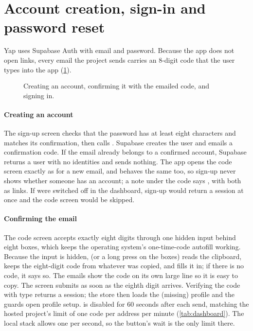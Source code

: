\section{Account creation, sign-in and password reset}
\label{sec:flow-account}

Yap uses Supabase Auth with email and password. Because the app does not open links, every email the
project sends carries an 8-digit code that the user types into the app (\cref{fig:seq-account}).

\begin{figure}[ht]
  \centering
  
  \caption{Creating an account, confirming it with the emailed code, and signing in.}
  \label{fig:seq-account}
\end{figure}

\paragraph{Creating an account} The sign-up screen checks that the password has at least eight
characters and matches its confirmation, then calls . Supabase creates the user and emails a
confirmation code. If the email already belongs to a confirmed account, Supabase returns a user with no
identities and sends nothing. The app opens the code screen exactly as for a new email, and
 behaves the same too, so sign-up never shows whether someone has an account; a note
under the code says , with
both as links. If  were
switched off in the dashboard, sign-up would return a session at once and the code screen would be
skipped.

\paragraph{Confirming the email} The code screen accepts exactly eight digits through one hidden input
behind eight boxes, which keeps the operating system's one-time-code autofill working. Because the input
is hidden,  (or a long press on the boxes) reads the clipboard, keeps the eight-digit code
from whatever was copied, and fills it in; if there is no code, it says so. The emails show the code on
its own large line so it is easy to copy. The screen submits as soon as the eighth digit arrives. Verifying the code with type  returns a
session; the store then loads the (missing) profile and the guards open profile setup. 
is disabled for 60 seconds after each send, matching the hosted project's limit of one code per address
per minute (\cref{tab:dashboard}). The local stack allows one per second, so the button's wait is the
only limit there.

